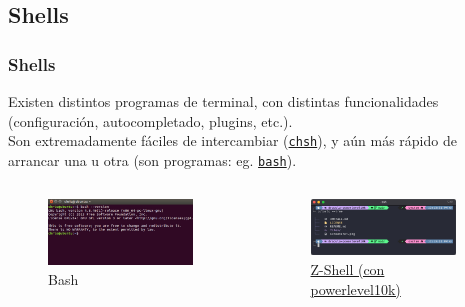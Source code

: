 \documentclass[aspectratio=43]{beamer}
\begin{document}
\subsection{Shells}

\begin{frame}
    \frametitle{Shells}
    Existen distintos programas de terminal, con distintas funcionalidades (configuración, autocompletado, plugins, etc.).\\
    Son extremadamente fáciles de intercambiar (\href{https://man7.org/linux/man-pages/man1/chsh.1.html}{\texttt{chsh}}), y aún más rápido de arrancar una u otra (son programas: eg. \href{https://www.man7.org/linux/man-pages/man1/bash.1.html}{\texttt{bash}}). 

    \begin{columns}[c]
        \begin{column}{0.5\textwidth}
            \begin{figure}
                \centering
                \includegraphics[width=0.9\textwidth]{img/bash_shell.jpg}
                \caption{Bash}
            \end{figure}
        \end{column}
        \begin{column}{0.5\textwidth}
            \begin{figure}
                \centering
                \includegraphics[width=0.9\textwidth]{img/powerlevel10k.png}
                \caption{\href{https://www.zsh.org/}{Z-Shell }\href{https://github.com/romkatv/powerlevel10k}{(con powerlevel10k)}}
            \end{figure}
        \end{column}
    \end{columns}

\end{frame}
\end{document}
